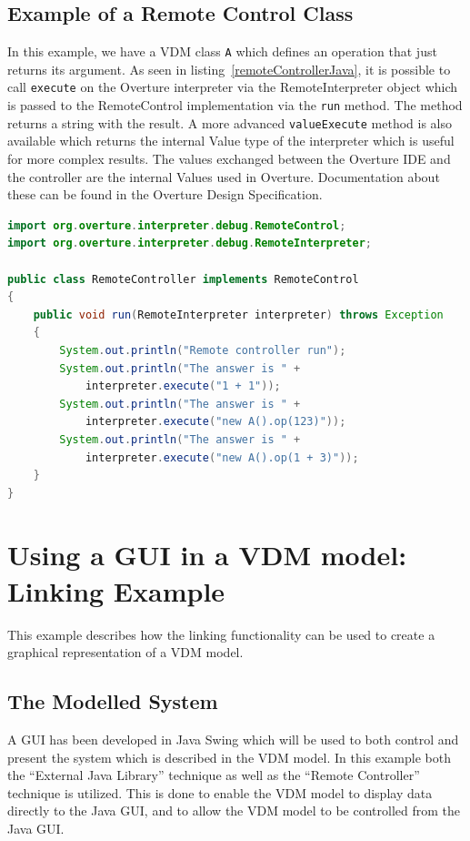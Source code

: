 \documentclass{overturerepchap}
\begin{document}
\subsection{Example of a Remote Control Class}
In this example, we have a VDM class \texttt{A} which defines an operation
that just returns its argument. As
seen in listing~\ref{remoteControllerJava}, it is possible to call
\texttt{execute} on the Overture interpreter via the RemoteInterpreter object
which is passed to the RemoteControl implementation via the \texttt{run} method.
The method returns a string with the result. A more
advanced \texttt{valueExecute} method is also available which returns the internal
Value type of the interpreter which is useful for more complex
results. The values exchanged between the Overture IDE and the
controller are the internal Values used in Overture. Documentation about these
can be found in the Overture Design Specification\cite{Battle10}.

\begin{lstlisting}[language=JAVA,label=remoteControllerJava,caption=Remote Controller Java class,captionpos=b]
import org.overture.interpreter.debug.RemoteControl;
import org.overture.interpreter.debug.RemoteInterpreter;

public class RemoteController implements RemoteControl
{
	public void run(RemoteInterpreter interpreter) throws Exception
	{
		System.out.println("Remote controller run");
		System.out.println("The answer is " +
			interpreter.execute("1 + 1"));
		System.out.println("The answer is " +
			interpreter.execute("new A().op(123)"));
		System.out.println("The answer is " +
			interpreter.execute("new A().op(1 + 3)"));
	}
}
\end{lstlisting}

\section{Using a GUI in a VDM model: Linking Example}\label{sec:gui}

This example describes how the linking functionality can be used to create a graphical representation of a VDM model.

\subsection{The Modelled System}
A GUI has been developed in Java Swing which will be used to both control and present the system which is described in the VDM model. In this example both the ``External Java Library'' technique as well as the ``Remote Controller'' technique is utilized. This is done to enable the VDM model to display data directly to the Java GUI, and to allow the VDM model to be controlled from the Java GUI.
\end{document}
